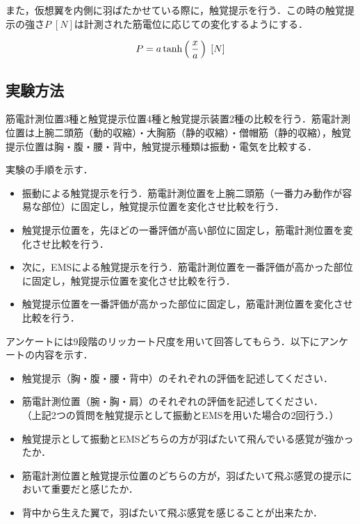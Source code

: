 \begin{small}
        また，仮想翼を内側に羽ばたかせている際に，触覚提示を行う．この時の触覚提示の強さ$P\;[N]$は計測された筋電位に応じての変化するようにする．
        
        \begin{eqnarray}
                \equlabel{haptics}
                P=a \tanh\left(\,\frac{x}{a}\,\right) \;[N]
        \end{eqnarray}
        
  \subsection{実験方法}
        筋電計測位置3種と触覚提示位置4種と触覚提示装置2種の比較を行う．筋電計測位置は上腕二頭筋（動的収縮）・大胸筋（静的収縮）・僧帽筋（静的収縮），触覚提示位置は胸・腹・腰・背中，触覚提示種類は振動・電気を比較する．

        実験の手順を示す．
        \begin{itemize}
        \item 振動による触覚提示を行う．筋電計測位置を上腕二頭筋（一番力み動作が容易な部位）に固定し，触覚提示位置を変化させ比較を行う．
        \item 触覚提示位置を，先ほどの一番評価が高い部位に固定し，筋電計測位置を変化させ比較を行う．
        \item 次に，EMSによる触覚提示を行う．筋電計測位置を一番評価が高かった部位に固定し，触覚提示位置を変化させ比較を行う．
        \item 触覚提示位置を一番評価が高かった部位に固定し，筋電計測位置を変化させ比較を行う．
        \end{itemize}


        アンケートには9段階のリッカート尺度を用いて回答してもらう．以下にアンケートの内容を示す．
        \begin{itemize}
        \item 触覚提示（胸・腹・腰・背中）のそれぞれの評価を記述してください．
        \item 筋電計測位置（腕・胸・肩）のそれぞれの評価を記述してください．\\
        （上記2つの質問を触覚提示として振動とEMSを用いた場合の2回行う．）
        \item  触覚提示として振動とEMSどちらの方が羽ばたいて飛んでいる感覚が強かったか．
        \item 筋電計測位置と触覚提示位置のどちらの方が，羽ばたいて飛ぶ感覚の提示において重要だと感じたか．
        \item 背中から生えた翼で，羽ばたいて飛ぶ感覚を感じることが出来たか．
        \end{itemize}



\end{small}
